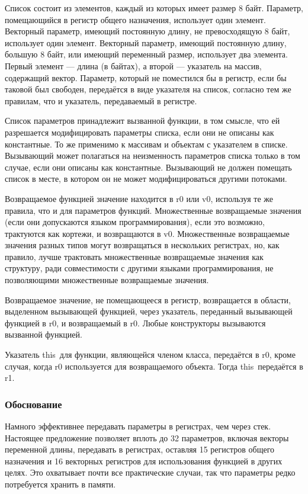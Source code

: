 \documentclass[forwardcom.tex]{subfiles}
\begin{document}
Список состоит из элементов, каждый из которых имеет размер 8 байт. Параметр, помещающийся в регистр общего назначения, использует один элемент. Векторный параметр, имеющий постоянную длину, не превосходящую 8 байт, использует один элемент. Векторный параметр, имеющий постоянную длину, большую 8 байт, или имеющий переменный размер, использует два элемента. Первый элемент --- длина (в байтах), а второй --- указатель на массив, содержащий вектор. Параметр, который не поместился бы в регистр, если бы таковой был свободен, передаётся в виде указателя на список, согласно тем же правилам, что и указатель, передаваемый в регистре. 

Список параметров принадлежит вызванной функции, в том смысле, что ей разрешается модифицировать параметры списка, если они не описаны как константные. То же применимо к массивам и объектам с указателем в списке. Вызывающий может полагаться на неизменность параметров списка только в том случае, если они описаны как константные. Вызывающий не должен помещать список в месте, в котором он не может модифицироваться другими потоками.

Возвращаемое функцией значение находится в r0 или v0, используя те же правила, что и для параметров функций. Множественные возвращаемые значения (если они допускаются языком программирования), если это возможно, трактуются как кортежи, и возвращаются в v0. Множественные возвращаемые значения разных типов могут возвращаться в нескольких регистрах, но, как правило, лучше трактовать множественные возвращаемые значения как структуру, ради совместимости с другими языками программирования, не позволяющими множественные возвращаемые значения.

Возвращаемое значение, не помещающееся в регистр, возвращается в области, выделенном вызывающей функцией, через указатель, переданный вызывающей функцией в r0, и возвращаемый в r0. Любые конструкторы вызываются вызванной функцией.

Указатель \glqq this\grqq\ для функции, являющейся членом класса, передаётся в r0, кроме случая, когда r0 используется для возвращаемого объекта. Тогда \glqq this\grqq\ передаётся в r1.  

\subsubsection{Обоснование}
Намного эффективнее передавать параметры в регистрах, чем через стек. Настоящее предложение позволяет вплоть до 32 параметров, включая векторы переменной длины, передавать в регистрах, оставляя 15 регистров общего назначения и 16 векторных регистров для использования функцией в других целях. Это охватывает почти все практические случаи, так что параметры редко потребуется хранить в памяти.
\end{document}
